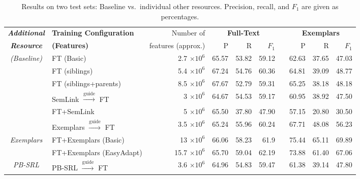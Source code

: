 \begin{table*}\centering\small
\begin{tabular}{>{\itshape}clrrrr@{~~}r@{~~}rrr}
\toprule
\normalfont\textbf{Additional} & \textbf{Training Configuration} & Number of & \multicolumn{3}{c}{\textbf{Full-Text}} && \multicolumn{3}{c}{\textbf{Exemplars}} \\
\cline{3-5}\cline{7-9}
\normalfont\textbf{Resource} &  \textbf{(Features)} & features (approx.) & P\hphantom{11} & R\hphantom{11} & $F_1$\hphantom{0} && P\hphantom{11} & R\hphantom{11} & $F_1$\hphantom{0} \\
\midrule
(Baseline) & FT (Basic) & 2.7 $\times 10^6$ & 65.57 & 53.82 & 59.12 && 62.63 & 37.65 & 47.03 \\
\midrule
\multirow{2}{*}{FN Hierarchy} & FT (siblings) & 5.4 $\times 10^6$ & 67.24 & 54.76 & 60.36 && 64.81 & 39.09 & 48.77 \\
          & FT (siblings+parents) & 8.5 $\times 10^6$ & 67.67 & 52.79 & 59.31 && 65.25 & 38.18 & 48.18 \\
\midrule
\multirow{2}{*}{SemLink} & SemLink $\xrightarrow{\text{guide}}$ FT & 3 $\times 10^6$ & 64.67 & 54.53 & 59.17 && 60.95 & 38.92 & 47.50 \\
& FT+SemLink & 5 $\times 10^6$ & 65.50 & 37.80 & 47.90 && 57.15 & 20.80 & 30.50 \\
\midrule
& Exemplars $\xrightarrow{\text{guide}}$ FT & 3.5 $\times 10^6$ & 65.24 & 55.96 & 60.24 && 67.71 & 48.08 & 56.23\\
Exemplars & FT+Exemplars (Basic) & 13 $\times 10^6$ & 66.06 & 58.23 & 61.9 && 75.44 & 65.11 & 69.89 \\
& FT+Exemplars (EasyAdapt) & 15.7 $\times 10^6$ & 65.70 & 59.04 & 62.19 && 73.88 & 61.40 & 67.06 \\
\midrule
PB-SRL & PB-SRL $\xrightarrow{\text{guide}}$ FT & 3.6 $\times 10^6$ & 64.96 & 54.83 & 59.47 && 61.38 & 39.14 & 47.80 \\
\bottomrule
\end{tabular}
\caption{Results on two test sets: Baseline vs.~individual other resources. 
Precision, recall, and $F_1$ are given as percentages.}
\label{tbl:results}
\end{table*}

